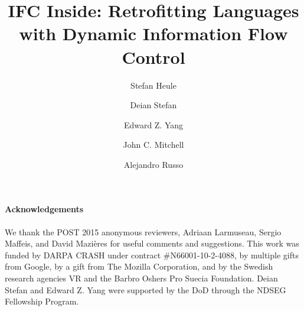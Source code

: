 \documentclass{llncs}
\newif\ifextended
\begin{document}


\title{
IFC Inside: Retrofitting Languages with Dynamic Information Flow Control
}
\ifextended
\subtitle{Extended Version}
\fi

\author{
 Stefan Heule \and
 Deian Stefan \and
 Edward Z. Yang \and
 John C. Mitchell \and
 Alejandro Russo
}

\maketitle


{\small
\paragraph{Acknowledgements}
We thank the POST 2015 anonymous reviewers, 
Adriaan Larmuseau,
Sergio Maffeis, and
David Mazi\`eres
for useful comments and suggestions.
%
This work was funded by DARPA CRASH under contract \#N66001-10-2-4088,
by multiple gifts from Google, by a gift from The Mozilla Corporation,
and by the Swedish research agencies VR and the Barbro Oshers Pro
Suecia Foundation.
%
Deian Stefan and Edward Z. Yang were supported by the DoD through the
NDSEG Fellowship Program.
}


{\frenchspacing\scriptsize
  \setlength{\bibsep}{2pt}
  
  
}

\ifextended
\clearpage
\balance
\fi
\end{document}
